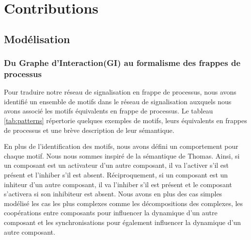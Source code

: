 \chapter{Contributions}

\section{Modélisation}\label{sec:modelisation}

\subsection{Du Graphe d'Interaction(GI) au formalisme des frappes de processus}

Pour traduire notre réseau de signalisation en frappe de processus, nous avons identifié un ensemble de motifs dans le réseau de signalisation auxquels nous avons 
associé les motifs équivalents en frappe de processus. Le tableau \ref{tab:patterns} répertorie quelques exemples de motifs, leurs équivalents en frappes de processus et une brève 
description de leur sémantique. 

En plus de l'identification des motifs, nous avons défini un comportement pour chaque motif. Nous nous sommes inspiré de la sémantique de Thomas\cite{Thomas73}. Ainsi, si un composant est un activateur 
d'un autre composant, il va l'activer s'il est présent et l'inhiber s'il est absent. Réciproquement, si un composant est un inhiteur d'un autre composant, il va l'inhiber s'il est 
présent et le composant s'activera si son inhibiteur est absent. Nous avons en plus des cas simples modélisé les cas les plus complexes comme les décompositions des complexes, les
coopérations entre composants pour influencer la dynamique d'un autre composant et les synchronisations pour également 
influencer la dynamique d'un autre composant.

